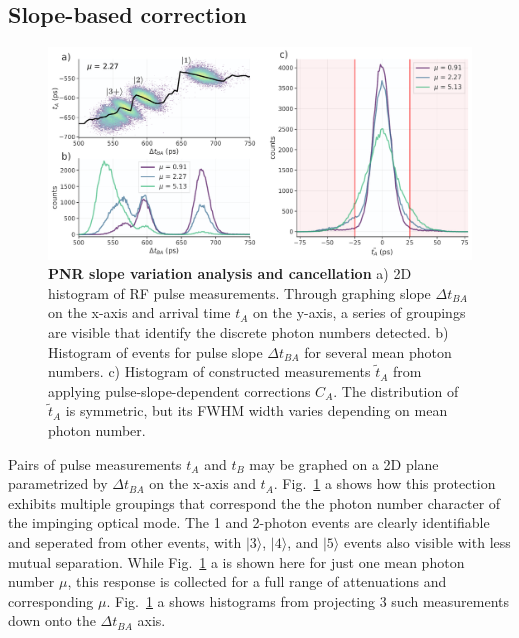 \documentclass[11pt]{caltech_thesis} %
\begin{document}
\hypertarget{slope-based-correction}{%
\subsection{Slope-based correction}\label{slope-based-correction}}

\hypertarget{fig:slope_correction}{%
\begin{figure}
\centering
\includegraphics[width=1\textwidth,height=\textheight]{./chapter_04/figs/slope_cancellation_light.pdf}
\caption[{PNR slope variation analysis and cancellation}]{\textbf{PNR slope variation analysis and cancellation} a) 2D histogram of RF pulse measurements. Through graphing slope $\Delta t_{BA}$ on the x-axis and arrival time $t_A$ on the y-axis, a series of groupings are visible that identify the discrete photon numbers detected. b) Histogram of events for pulse slope $\Delta t_{BA}$ for several mean photon numbers. c) Histogram of constructed measurements $\tilde{t}_A$ from applying pulse-slope-dependent corrections $C_A$. The distribution of $\tilde{t}_A$ is symmetric, but its FWHM width varies depending on mean photon number.}
\label{fig:slope_correction}
\end{figure}
}

Pairs of pulse measurements $t_A$ and $t_B$ may be graphed on a 2D plane parametrized by $\Delta t_{BA}$ on the x-axis and $t_A$. Fig.~\ref{fig:slope_correction} a shows how this protection exhibits multiple groupings that correspond the the photon number character of the impinging optical mode. The 1 and 2-photon events are clearly identifiable and seperated from other events, with $|3\rangle$, $|4\rangle$, and $|5\rangle$ events also visible with less mutual separation. While Fig.~\ref{fig:slope_correction} a is shown here for just one mean photon number $\mu$, this response is collected for a full range of attenuations and corresponding $\mu$. Fig.~\ref{fig:slope_correction} a shows histograms from projecting 3 such measurements down onto the $\Delta t_{BA}$ axis.
\end{document}
